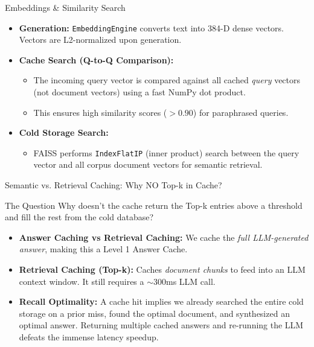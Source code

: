 \documentclass[aspectratio=169]{beamer}
\begin{document}
\begin{frame}{Embeddings \& Similarity Search}
    \begin{itemize}
        \item \textbf{Generation:} \texttt{EmbeddingEngine} converts text into 384-D dense vectors. Vectors are L2-normalized upon generation.
        \item \textbf{Cache Search (Q-to-Q Comparison):}
        \begin{itemize}
            \item The incoming query vector is compared against all cached \textit{query} vectors (not document vectors) using a fast NumPy dot product.
            \item This ensures high similarity scores ($> 0.90$) for paraphrased queries.
        \end{itemize}
        \item \textbf{Cold Storage Search:}
        \begin{itemize}
            \item FAISS performs \texttt{IndexFlatIP} (inner product) search between the query vector and all corpus document vectors for semantic retrieval.
        \end{itemize}
    \end{itemize}
\end{frame}

\begin{frame}{Semantic vs. Retrieval Caching: Why NO Top-k in Cache?}
    \begin{block}{The Question}
    Why doesn't the cache return the Top-k entries above a threshold and fill the rest from the cold database?
    \end{block}
    
    \begin{itemize}
        \item \textbf{Answer Caching vs Retrieval Caching:} We cache the \textit{full LLM-generated answer}, making this a Level 1 Answer Cache.
        \item \textbf{Retrieval Caching (Top-k):} Caches \textit{document chunks} to feed into an LLM context window. It still requires a $\sim$300ms LLM call.
        \item \textbf{Recall Optimality:} A cache hit implies we already searched the entire cold storage on a prior miss, found the optimal document, and synthesized an optimal answer. Returning multiple cached answers and re-running the LLM defeats the immense latency speedup.
    \end{itemize}
\end{frame}
\end{document}
